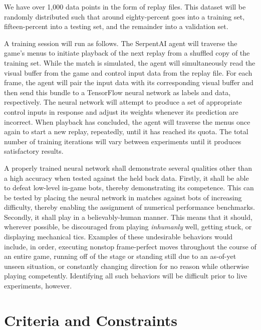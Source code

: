 We have over 1,000 data points in the form of replay files. This dataset will be randomly distributed such that around eighty-percent goes into a training set, fifteen-percent into a testing set, and the remainder into a validation set.

A training session will run as follows. The SerpentAI agent will traverse the game's menus to initiate playback of the next replay from a shuffled copy of the training set. While the match is simulated, the agent will simultaneously read the visual buffer from the game and control input data from the replay file. For each frame, the agent will pair the input data with its corresponding visual buffer and then send this bundle to a TensorFlow neural network as labels and data, respectively. The neural network will attempt to produce a set of appropriate control inputs in response and adjust its weights  whenever its prediction are incorrect. When playback has concluded, the agent will traverse the menus once again to start a new replay, repeatedly, until it has reached its quota. The total number of training iterations will vary between experiments until it produces satisfactory results.

A properly trained neural network shall demonstrate several qualities other than a high accuracy when tested against the held back data. Firstly, it shall be able to defeat low-level in-game bots, thereby demonstrating its competence. This can be tested by placing the neural network in matches against bots of increasing difficulty, thereby enabling the assignment of numerical performance benchmarks. Secondly, it shall play in a believably-human manner. This means that it should, wherever possible, be discouraged from playing {\it inhumanly} well, getting stuck, or displaying mechanical tics. Examples of these undesirable behaviors would include, in order, executing nonstop frame-perfect moves throughout the course of an entire game, running off of the stage or standing still due to an as-of-yet unseen situation, or constantly changing direction for no reason while otherwise playing competently. Identifying all such behaviors will be difficult prior to live experiments, however.




\section{Criteria and Constraints}

